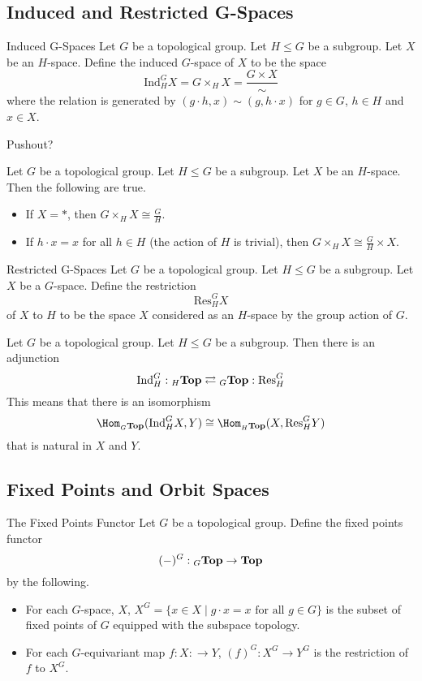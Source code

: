 \documentclass[a4paper]{article}
\begin{document}
\subsection{Induced and Restricted G-Spaces}
\begin{defn}{Induced G-Spaces}{} Let $G$ be a topological group. Let $H\leq G$ be a subgroup. Let $X$ be an $H$-space. Define the induced $G$-space of $X$ to be the space $$\text{Ind}_H^GX=G\times_HX=\frac{G\times X}{\sim}$$ where the relation is generated by $(g\cdot h,x)\sim(g,h\cdot x)$ for $g\in G$, $h\in H$ and $x\in X$. 
\end{defn}

Pushout?

\begin{lmm}{}{} Let $G$ be a topological group. Let $H\leq G$ be a subgroup. Let $X$ be an $H$-space. Then the following are true. 
\begin{itemize}
\item If $X=\ast$, then $G\times_H X\cong\frac{G}{H}$. 
\item If $h\cdot x=x$ for all $h\in H$ (the action of $H$ is trivial), then $G\times_HX\cong\frac{G}{H}\times X$. 
\end{itemize}
\end{lmm}

\begin{defn}{Restricted G-Spaces}{} Let $G$ be a topological group. Let $H\leq G$ be a subgroup. Let $X$ be a $G$-space. Define the restriction $$\text{Res}_H^GX$$ of $X$ to $H$ to be the space $X$ considered as an $H$-space by the group action of $G$. 
\end{defn}

\begin{prp}{}{} Let $G$ be a topological group. Let $H\leq G$ be a subgroup. Then there is an adjunction $$\text{Ind}_H^G:{_H\bold{Top}}\rightleftarrows{_G\bold{Top}}:\text{Res}_H^G$$ This means that there is an isomorphism $$\Hom_{_G\bold{Top}}(\text{Ind}_H^GX,Y)\cong\Hom_{_H\bold{Top}}(X,\text{Res}_H^GY)$$ that is natural in $X$ and $Y$. 
\end{prp}

\subsection{Fixed Points and Orbit Spaces}
\begin{defn}{The Fixed Points Functor}{} Let $G$ be a topological group. Define the fixed points functor $$(-)^G:{_G\bold{Top}}\to\bold{Top}$$ by the following. 
\begin{itemize}
\item For each $G$-space, $X$, $X^G=\{x\in X\;|\;g\cdot x=x\text{ for all }g\in G\}$ is the subset of fixed points of $G$ equipped with the subspace topology. 
\item For each $G$-equivariant map $f:X:\to Y$, $(f)^G:X^G\to Y^G$ is the restriction of $f$ to $X^G$. 
\end{itemize}
\end{defn}
\end{document}
